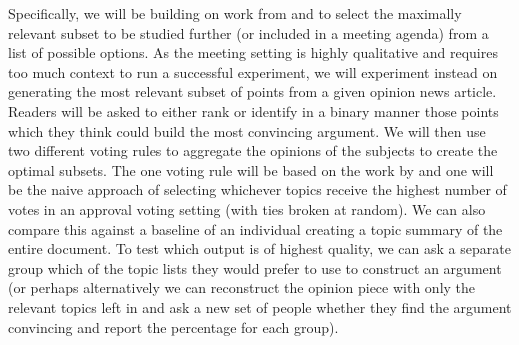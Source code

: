 \documentclass[final,authoryear,11pt,times]{elsarticle}
\begin{document}
Specifically, we will be building on work from \citet{hahn2016knowledge} and \citep{caragiannis2017subset} to select the maximally relevant subset to be studied further (or included in a meeting agenda) from a list of possible options. As the meeting setting is highly qualitative and requires too much context to run a successful experiment, we will experiment instead on generating the most relevant subset of points from a given opinion news article. Readers will be asked to either rank or identify in a binary manner those points which they think could build the most convincing argument. We will then use two different voting rules to aggregate the opinions of the subjects to create the optimal subsets. The one voting rule will be based on the work by \citet{caragiannis2017subset} and one will be the naive approach of selecting whichever topics receive the highest number of votes in an approval voting setting (with ties broken at random). We can also compare this against a baseline of an individual creating a topic summary of the entire document. To test which output is of highest quality, we can ask a separate group which of the topic lists they would prefer to use to construct an argument (or perhaps alternatively we can reconstruct the opinion piece with only the relevant topics left in and ask a new set of people whether they find the argument convincing and report the percentage for each group).



\end{document}
